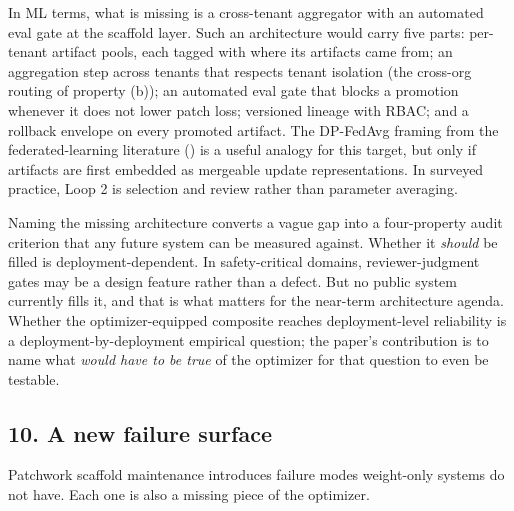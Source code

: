 \documentclass[
]{article}
\begin{document}
In ML terms, what is missing is a cross-tenant aggregator with an
automated eval gate at the scaffold layer. Such an architecture would
carry five parts: per-tenant artifact pools, each tagged with where its
artifacts came from; an aggregation step across tenants that respects
tenant isolation (the cross-org routing of property (b)); an automated
eval gate that blocks a promotion whenever it does not lower patch loss;
versioned lineage with RBAC; and a rollback envelope on every promoted
artifact. The DP-FedAvg framing from the federated-learning literature
() is a useful
analogy for this target, but only if artifacts are first embedded as
mergeable update representations. In surveyed practice, Loop 2 is
selection and review rather than parameter averaging.

Naming the missing architecture converts a vague gap into a
four-property audit criterion that any future system can be measured
against. Whether it \emph{should} be filled is deployment-dependent. In
safety-critical domains, reviewer-judgment gates may be a design feature
rather than a defect. But no public system currently fills it, and that
is what matters for the near-term architecture agenda. Whether the
optimizer-equipped composite reaches deployment-level reliability is a
deployment-by-deployment empirical question; the paper's contribution is
to name what \emph{would have to be true} of the optimizer for that
question to even be testable.

\subsection{10. A new failure surface}\label{a-new-failure-surface}

Patchwork scaffold maintenance introduces failure modes weight-only
systems do not have. Each one is also a missing piece of the optimizer.
\end{document}
